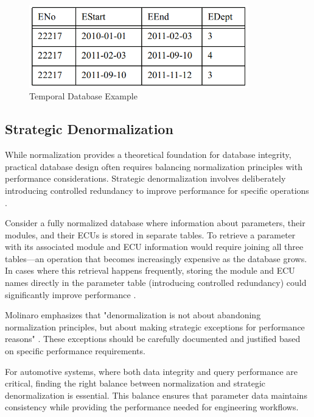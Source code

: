 \begin{figure}[ht]
    \centering
    \includegraphics[width=0.85\textwidth]{figures/temporal_database.png}
    \caption{Temporal Database Example \cite{kulkarni2012temporal}}
    \label{fig:temporal-database}
\end{figure}

\subsection{Strategic Denormalization}
\label{subsec:strategic-denormalization}

While normalization provides a theoretical foundation for database integrity, practical database design often requires balancing normalization principles with performance considerations. Strategic denormalization involves deliberately introducing controlled redundancy to improve performance for specific operations \cite{bhattacherjee2015principles}.

Consider a fully normalized database where information about parameters, their modules, and their \acp{ECU} is stored in separate tables. To retrieve a parameter with its associated module and \ac{ECU} information would require joining all three tables—an operation that becomes increasingly expensive as the database grows. In cases where this retrieval happens frequently, storing the module and \ac{ECU} names directly in the parameter table (introducing controlled redundancy) could significantly improve performance \cite{schwartz2012high}.

Molinaro emphasizes that "denormalization is not about abandoning normalization principles, but about making strategic exceptions for performance reasons" \cite{molinaro2005sql}. These exceptions should be carefully documented and justified based on specific performance requirements.

For automotive systems, where both data integrity and query performance are critical, finding the right balance between normalization and strategic denormalization is essential. This balance ensures that parameter data maintains consistency while providing the performance needed for engineering workflows.

